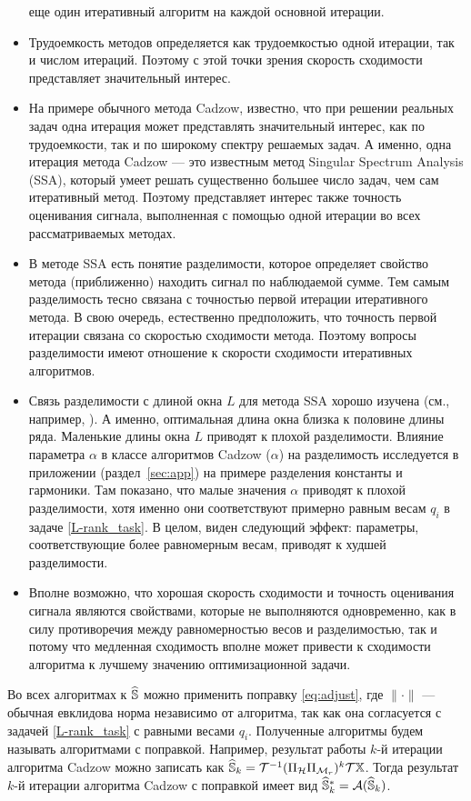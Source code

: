 \documentclass[12pt,a4paper,fleqn,leqno]{article}
\begin{document}
\begin{itemize}
еще один итеративный алгоритм на каждой основной итерации.
\item
Трудоемкость методов определяется как трудоемкостью одной итерации, так и числом итераций. Поэтому с этой точки зрения скорость сходимости представляет значительный интерес.
\item
На примере обычного метода Cadzow, известно, что при решении реальных задач одна итерация может представлять значительный интерес, как по трудоемкости, так и по широкому спектру решаемых задач. А именно, одна итерация метода Cadzow --- это известным метод Singular Spectrum Analysis (SSA), который умеет решать существенно большее число задач, чем сам итеративный метод. Поэтому представляет интерес также точность оценивания сигнала, выполненная с помощью одной итерации во всех рассматриваемых методах.
\item
В методе SSA есть понятие разделимости, которое определяет свойство метода (приближенно) находить сигнал по наблюдаемой сумме. Тем самым разделимость
тесно связана с точностью первой итерации итеративного метода. В свою очередь, естественно предположить, что точность первой итерации связана со скоростью сходимости метода. Поэтому вопросы разделимости имеют отношение к скорости сходимости итеративных алгоритмов.
\item
Связь разделимости с длиной окна $L$ для метода SSA хорошо изучена (см., например, \cite{Golyandina2010}). А именно, оптимальная длина окна близка
к половине длины ряда. Маленькие длины окна $L$ приводят к плохой разделимости. Влияние параметра $\alpha$ в классе алгоритмов
Cadzow ($\alpha$) на разделимость исследуется в приложении (раздел~\ref{sec:app}) на примере разделения константы и гармоники. Там показано, что малые значения
$\alpha$ приводят к плохой разделимости, хотя именно они соответствуют примерно равным весам $q_i$ в задаче \eqref{L-rank_task}.
В целом, виден следующий эффект: параметры, соответствующие более равномерным весам, приводят к худшей разделимости.
\item
Вполне возможно, что хорошая скорость сходимости и точность оценивания сигнала являются свойствами, которые не выполняются одновременно, как в силу
противоречия между равномерностью весов и разделимостью, так и потому что медленная сходимость вполне может привести к сходимости алгоритма к лучшему значению оптимизационной задачи.
\end{itemize}

\begin{remark}
\label{rem:adjust}
Во всех алгоритмах к $\widehat{\mathbb{S}}$ можно применить поправку \eqref{eq:adjust}, где $\|\cdot\|$ --- обычная евклидова норма независимо от алгоритма,
так как она согласуется с задачей \eqref{L-rank_task} с равными весами $q_i$.
Полученные алгоритмы будем называть алгоритмами с поправкой.
Например, результат работы $k$-й итерации алгоритма Cadzow можно записать как $\widehat{\mathbb{S}}_k = \mathcal{T}^{-1}(\Pi_{\mathcal{H}} \Pi_{\mathcal{M}_r})^k \mathcal{T} \mathbb{X}$.
Тогда результат $k$-й итерации алгоритма Cadzow с поправкой имеет вид $\widehat{\mathbb{S}}_k^*=\mathcal{A}(\widehat{\mathbb{S}}_k)$.
\end{remark}
\end{document}
